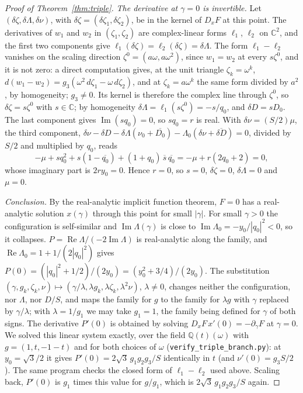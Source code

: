 \documentclass[11pt]{article}
\theoremstyle{definition}
\newcommand{\re}{\operatorname{Re}}
\newcommand{\im}{\operatorname{Im}}
\newcommand{\C}{\mathbb{C}}
\newcommand{\Q}{\mathbb{Q}}
\begin{document}
\begin{proof}[Proof of Theorem~\ref{thm:triple}]
\emph{The derivative at $\gamma = 0$ is invertible.} Let $(\delta\zeta, \delta\Lambda, \delta\nu)$, with $\delta\zeta = (\delta\zeta_1, \delta\zeta_2)$, be in the kernel of $D_xF$ at this point. The derivatives of $w_1$ and $w_2$ in $(\zeta_1, \zeta_2)$ are complex-linear forms $\ell_1$, $\ell_2$ on $\C^2$, and the first two components give $\ell_1(\delta\zeta) = \ell_2(\delta\zeta) = \delta\Lambda$. The form $\ell_1 - \ell_2$ vanishes on the scaling direction $\zeta^0 = (a\omega, a\omega^2)$, since $w_1 = w_2$ at every $s\zeta^0$, and it is not zero: a direct computation gives, at the unit triangle $\zeta_k = \omega^k$, $d(w_1 - w_2) = g_3(\omega^2\,d\zeta_1 - \omega\,d\zeta_2)$, and at $\zeta_k = a\omega^k$ the same form divided by $a^2$, by homogeneity; $g_3 \ne 0$. Its kernel is therefore the complex line through $\zeta^0$, so $\delta\zeta = s\zeta^0$ with $s \in \C$; by homogeneity $\delta\Lambda = \ell_1(s\zeta^0) = -s/q_0$, and $\delta D = sD_0$. The last component gives $\im(sq_0) = 0$, so $sq_0 = r$ is real. With $\delta\nu = (S/2)\mu$, the third component, $\delta\nu - \delta D - \delta\Lambda(\nu_0 + \overline{D_0}) - \Lambda_0(\delta\nu + \overline{\delta D}) = 0$, divided by $S/2$ and multiplied by $q_0$, reads
\[
  -\mu + sq_0^2 + s(1 - \overline{q_0}) + (1 + q_0)\,\overline{s}\,\overline{q_0} = -\mu + r(2q_0 + 2) = 0,
\]
whose imaginary part is $2ry_0 = 0$. Hence $r = 0$, so $s = 0$, $\delta\zeta = 0$, $\delta\Lambda = 0$ and $\mu = 0$.

\emph{Conclusion.} By the real-analytic implicit function theorem, $F = 0$ has a real-analytic solution $x(\gamma)$ through this point for small $|\gamma|$. For small $\gamma > 0$ the configuration is self-similar and $\im\Lambda(\gamma)$ is close to $\im\Lambda_0 = -y_0/|q_0|^2 < 0$, so it collapses. $P = \re\Lambda/(-2\im\Lambda)$ is real-analytic along the family, and $\re\Lambda_0 = 1 + 1/(2|q_0|^2)$ gives $P(0) = (|q_0|^2 + 1/2)/(2y_0) = (y_0^2 + 3/4)/(2y_0)$. The substitution $(\gamma, g_k, \zeta_k, \nu) \mapsto (\gamma/\lambda, \lambda g_k, \lambda\zeta_k, \lambda^2\nu)$, $\lambda \ne 0$, changes neither the configuration, nor $\Lambda$, nor $D/S$, and maps the family for $g$ to the family for $\lambda g$ with $\gamma$ replaced by $\gamma/\lambda$; with $\lambda = 1/g_1$ we may take $g_1 = 1$, the family being defined for $\gamma$ of both signs. The derivative $P'(0)$ is obtained by solving $D_xF\,x'(0) = -\partial_\gamma F$ at $\gamma = 0$. We solved this linear system exactly, over the field $\Q(t)(\omega)$ with $g = (1, t, -1 - t)$ and for both choices of $\omega$ (\texttt{verify\_\allowbreak triple\_\allowbreak branch.py}): at $y_0 = \sqrt{3}/2$ it gives $P'(0) = 2\sqrt{3}\,g_1g_2g_3/S$ identically in $t$ (and $\nu'(0) = g_3S/2$). The same program checks the closed form of $\ell_1 - \ell_2$ used above. Scaling back, $P'(0)$ is $g_1$ times this value for $g/g_1$, which is $2\sqrt{3}\,g_1g_2g_3/S$ again.
\end{proof}
\end{document}
